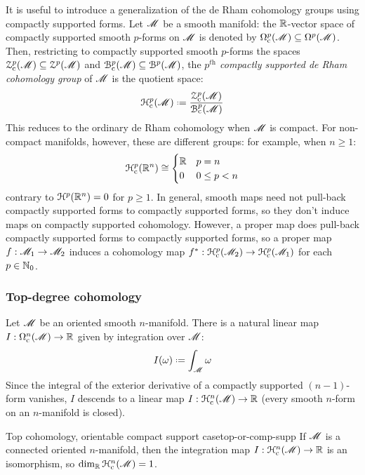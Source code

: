 It is useful to introduce a generalization of the de Rham cohomology groups using compactly supported forms. Let $ \mathscr{M} $ be a smooth manifold: the $ \mathbb{R} $-vector space of compactly supported smooth $ p $-forms on $ \mathscr{M} $ is denoted by $ \Omega_\text{c}^{p}(\mathscr{M}) \subseteq \Omega^{p}(\mathscr{M}) $. Then, restricting to compactly supported smooth $ p $-forms the spaces $ \EuScript{Z}_\text{c}^{p}(\mathscr{M}) \subseteq \EuScript{Z}^{p}(\mathscr{M}) $ and $ \EuScript{B}_\text{c}^{p}(\mathscr{M}) \subseteq \EuScript{B}^{p}(\mathscr{M}) $, the \emph{$ p^\textit{th} $ compactly supported de Rham cohomology group} of $ \mathscr{M} $ is the quotient space:
\begin{equation}
  \hpc{p}(\man) \defeq \frac{\zpc{p}(\man)}{\bpc{p}(\man)}
\end{equation}
This reduces to the ordinary de Rham cohomology when $ \mathscr{M} $ is compact. For non-compact manifolds, however, these are different groups: for example, when $ n \geq 1 $:
\begin{equation}
  \EuScript{H}_\text{c}^{p}(\mathbb{R}^n) \cong
  \begin{cases}
    \mathbb{R} & p = n \\
    0 & 0 \leq p < n
  \end{cases}
\end{equation}
contrary to $ \EuScript{H}^{p}(\mathbb{R}^n) = 0 $ for $ p \geq 1 $. In general, smooth maps need not pull-back compactly supported forms to compactly supported forms, so they don't induce maps on compactly supported cohomology. However, a proper map does pull-back compactly supported forms to compactly supported forms, so a proper map $ f : \mathscr{M}_1 \rightarrow \mathscr{M}_2 $ induces a cohomology map $ f^* : \EuScript{H}_\text{c}^{p}(\mathscr{M}_2) \rightarrow \EuScript{H}_\text{c}^{p}(\mathscr{M}_1) $ for each $ p \in \mathbb{N}_0 $.

\subsubsection{Top-degree cohomology}

Let $ \mathscr{M} $ be an oriented smooth $ n $-manifold. There is a natural linear map $ I : \Omega_\text{c}^{n}(\mathscr{M}) \rightarrow \mathbb{R} $ given by integration over $ \mathscr{M} $:
\begin{equation*}
  I(\omega) \defeq \int_\man \omega
\end{equation*}
Since the integral of the exterior derivative of a compactly supported $ (n-1) $-form vanishes, $ I $ descends to a linear map $ I : \EuScript{H}_\text{c}^{n}(\mathscr{M}) \rightarrow \mathbb{R} $ (every smooth $ n $-form on an $ n $-manifold is closed).

\begin{proposition}{Top cohomology, orientable compact support case}{top-or-comp-supp}
  If $ \mathscr{M} $ is a connected oriented $ n $-manifold, then the integration map $ I : \EuScript{H}_\text{c}^{n}(\mathscr{M}) \rightarrow \mathbb{R} $ is an isomorphism, so $ \dim_{\mathbb{R}} \EuScript{H}_\text{c}^{n}(\mathscr{M}) = 1 $.
\end{proposition}


